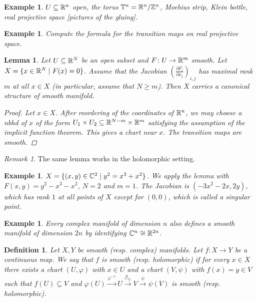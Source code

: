 \documentclass[A4paper, british, reqno]{amsart}
\theoremstyle{darkgreentheorem}
\newtheorem{lm}[thm]{Lemma}
\theoremstyle{darkbluedefinition}
\newtheorem{defn}[thm]{Definition}
\theoremstyle{darkredexample}
\newtheorem{exa}[thm]{Example}
\theoremstyle{remark}
\newtheorem{rem}[thm]{Remark}
\newcommand{\1}{\mathbbm{1}}
\newcommand{\tms}{\times}
\newcommand{\sub}{\subseteq}
\begin{document}
\begin{exa}
    $U\sub \R^{n}$ open, the torus $\mathbb{T}^{n}=\mathbb{R}^{n}/\mathbb{Z}^{n}$, Moebius strip, Klein bottle, real projective space [pictures of the gluing].
\end{exa}

\begin{exa}
    Compute the formula for the transition maps on real projective space.
\end{exa}

\begin{lm}
    Let $U\sub \R^{N}$ be an open subset and $F\colon U\to \mathbb{R}^{m}$ smooth.
    Let $X=\{ x\in \mathbb{R}^{N}\mid F(x)=0\}$.
    Assume that the Jacobian $(\frac{\partial F_{i}}{\partial x_{j}})_{i,j}$ has maximal rank $m$ at all $x\in X$ (in particular, assume that $N\geqslant m$).
    Then $X$ carries a canonical structure of smooth manifold.
    \begin{proof}
	Let $x\in X$.
	After reordering of the coordinates of $\mathbb{R}^{n}$, we may choose a nbhd of $x$ of the form $U_{1}\tms U_{2}\sub \R^{N-m}\tms \R^{m}$ satisfying the assumption of the implicit function theorem.
	This gives a chart near $x$.
	The transition maps are smooth.
    \end{proof}
\end{lm}

\begin{rem}
    The same lemma works in the holomorphic setting.
\end{rem}

\begin{exa}
    $X=\{(x,y)\in \mathbb{C}^{2}\mid y^{2}=x^{3}+x^{2} \}$.
    We apply the lemma with $F(x,y)=y^{2}-x^{3}-x^{2}$, $N=2$ and $m=1$.
    The Jacobian is $(-3x^{2}-2x,2y)$, which has rank $1$ at all points of $X$ except for $(0,0)$, which is called a \textit{singular point}.
\end{exa}

\begin{exa}
    Every complex manifold of dimension $n$ also defines a smooth manifold of dimension $2n$ by identifying $\mathbb{C}^{n}\cong \mathbb{R}^{2n}$.
\end{exa}

\begin{defn}
    Let $X,Y$ be smooth (resp. complex) manifolds.
    Let $f\colon X\to Y$ be a continuous map.
    We say that $f$ is \textit{smooth} (resp. \textit{holomorphic}) if for every $x\in X$ there exists a chart $(U,\varphi)$ with $x\in U$ and a chart $(V,\psi)$ with $f(x)=y\in V$ such that $f(U)\sub V$ and $\varphi(U)\xrightarrow{\varphi^{-1}}U\xrightarrow{f|_{U}} V\xrightarrow{\psi} \psi(V)$ is smooth (resp. holomorphic).
\end{defn}
\end{document}
